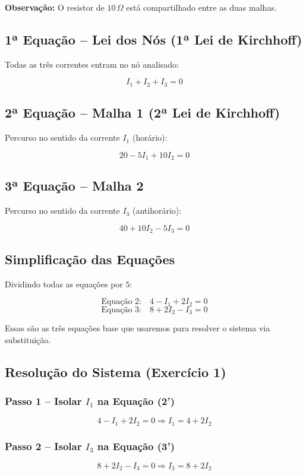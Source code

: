 \textbf{Observação:} O resistor de $10\,\Omega$ está compartilhado entre as duas malhas.

\subsection{1ª Equação – Lei dos Nós (1ª Lei de Kirchhoff)}
Todas as três correntes entram no nó analisado:

\[
I_1 + I_2 + I_3 = 0 \tag{1}
\]

\subsection{2ª Equação – Malha 1 (2ª Lei de Kirchhoff)}
Percurso no sentido da corrente $I_1$ (horário):

\[
20 - 5I_1 + 10I_2 = 0 \tag{2}
\]

\subsection{3ª Equação – Malha 2}
Percurso no sentido da corrente $I_3$ (antihorário):

\[
40 + 10I_2 - 5I_3 = 0 \tag{3}
\]

\subsection{Simplificação das Equações}
Dividindo todas as equações por $5$:

\[
\text{Equação 2:} \quad 4 - I_1 + 2I_2 = 0 \tag{2'}
\]
\[
\text{Equação 3:} \quad 8 + 2I_2 - I_3 = 0 \tag{3'}
\]

Essas são as três equações base que usaremos para resolver o sistema via substituição.

\subsection{Resolução do Sistema (Exercício 1)}

\subsubsection{Passo 1 – Isolar $I_1$ na Equação (2')}
\[
4 - I_1 + 2I_2 = 0 \Rightarrow I_1 = 4 + 2I_2 \tag{4}
\]

\subsubsection{Passo 2 – Isolar $I_3$ na Equação (3')}
\[
8 + 2I_2 - I_3 = 0 \Rightarrow I_3 = 8 + 2I_2 \tag{5}
\]

